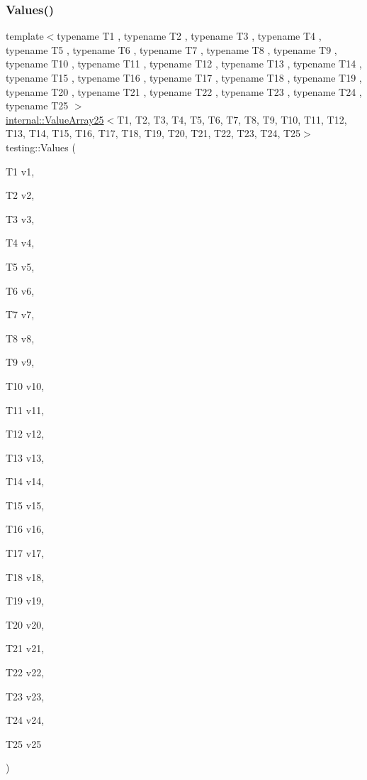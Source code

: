 \subsubsection{\texorpdfstring{Values()}{Values()}\hspace{0.1cm}{\footnotesize\ttfamily [25/50]}}
{\footnotesize\ttfamily template$<$typename T1 , typename T2 , typename T3 , typename T4 , typename T5 , typename T6 , typename T7 , typename T8 , typename T9 , typename T10 , typename T11 , typename T12 , typename T13 , typename T14 , typename T15 , typename T16 , typename T17 , typename T18 , typename T19 , typename T20 , typename T21 , typename T22 , typename T23 , typename T24 , typename T25 $>$ \\
\mbox{\hyperlink{classtesting_1_1internal_1_1ValueArray25}{internal\+::\+Value\+Array25}}$<$T1, T2, T3, T4, T5, T6, T7, T8, T9, T10, T11, T12, T13, T14, T15, T16, T17, T18, T19, T20, T21, T22, T23, T24, T25$>$ testing\+::\+Values (\begin{DoxyParamCaption}\item[{T1}]{v1,  }\item[{T2}]{v2,  }\item[{T3}]{v3,  }\item[{T4}]{v4,  }\item[{T5}]{v5,  }\item[{T6}]{v6,  }\item[{T7}]{v7,  }\item[{T8}]{v8,  }\item[{T9}]{v9,  }\item[{T10}]{v10,  }\item[{T11}]{v11,  }\item[{T12}]{v12,  }\item[{T13}]{v13,  }\item[{T14}]{v14,  }\item[{T15}]{v15,  }\item[{T16}]{v16,  }\item[{T17}]{v17,  }\item[{T18}]{v18,  }\item[{T19}]{v19,  }\item[{T20}]{v20,  }\item[{T21}]{v21,  }\item[{T22}]{v22,  }\item[{T23}]{v23,  }\item[{T24}]{v24,  }\item[{T25}]{v25 }\end{DoxyParamCaption})}

